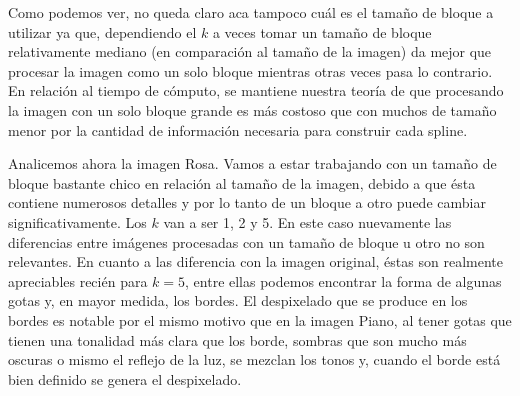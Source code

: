 \documentclass[a4paper]{article}
\begin{document}
Como podemos ver, no queda claro aca tampoco cuál es el tamaño de bloque a utilizar ya que, dependiendo el $k$ a veces tomar un tamaño de bloque relativamente mediano (en comparación al tamaño de la imagen) da mejor que procesar la imagen como un solo bloque mientras otras veces pasa lo contrario. En relación al tiempo de cómputo, se mantiene nuestra teoría de que procesando la imagen con un solo bloque grande es más costoso que con muchos de tamaño menor por la cantidad de información necesaria para construir cada spline.


Analicemos ahora la imagen Rosa. Vamos a estar trabajando con un tamaño de bloque bastante chico en relación al tamaño de la imagen, debido a que ésta contiene numerosos detalles y por lo tanto de un bloque a otro puede cambiar significativamente. Los $k$ van a ser 1, 2 y 5. En este caso nuevamente las diferencias entre imágenes procesadas con un tamaño de bloque u otro no son relevantes. En cuanto a las diferencia con la imagen original, éstas son realmente apreciables recién para $k = 5$, entre ellas podemos encontrar la forma de algunas gotas y, en mayor medida, los bordes. El despixelado que se produce en los bordes es notable por el mismo motivo que en la imagen Piano, al tener gotas que tienen una tonalidad más clara que los borde, sombras que son mucho más oscuras o mismo el reflejo de la luz, se mezclan los tonos y, cuando el borde está bien definido se genera el despixelado.
\end{document}
